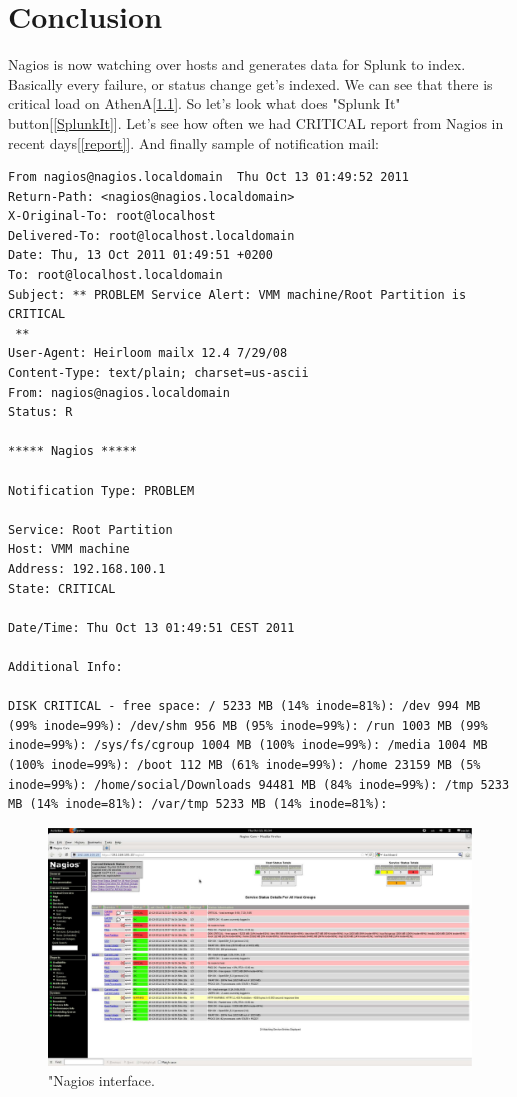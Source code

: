 \documentclass[10pt,a4paper,final]{report}
\begin{document}
\chapter{Conclusion}
Nagios is now watching over hosts and generates data for Splunk to index. Basically every failure, or status change get's indexed. We can see that there is critical load on AthenA[\ref{Nagios}]. So let's look what does "Splunk It" button[\ref{SplunkIt}]. Let's see how often we had CRITICAL report from Nagios in recent days[\ref{report}]. And finally sample of notification mail:
\begin{lstlisting}
From nagios@nagios.localdomain  Thu Oct 13 01:49:52 2011
Return-Path: <nagios@nagios.localdomain>
X-Original-To: root@localhost
Delivered-To: root@localhost.localdomain
Date: Thu, 13 Oct 2011 01:49:51 +0200
To: root@localhost.localdomain
Subject: ** PROBLEM Service Alert: VMM machine/Root Partition is CRITICAL
 **
User-Agent: Heirloom mailx 12.4 7/29/08
Content-Type: text/plain; charset=us-ascii
From: nagios@nagios.localdomain
Status: R

***** Nagios *****

Notification Type: PROBLEM

Service: Root Partition
Host: VMM machine
Address: 192.168.100.1
State: CRITICAL

Date/Time: Thu Oct 13 01:49:51 CEST 2011

Additional Info:

DISK CRITICAL - free space: / 5233 MB (14% inode=81%): /dev 994 MB (99% inode=99%): /dev/shm 956 MB (95% inode=99%): /run 1003 MB (99% inode=99%): /sys/fs/cgroup 1004 MB (100% inode=99%): /media 1004 MB (100% inode=99%): /boot 112 MB (61% inode=99%): /home 23159 MB (5% inode=99%): /home/social/Downloads 94481 MB (84% inode=99%): /tmp 5233 MB (14% inode=81%): /var/tmp 5233 MB (14% inode=81%):
\end{lstlisting}
\begin{figure}[hbpt]
\begin{center}
\includegraphics[width=\linewidth]{Nagios.pdf}
\end{center}
\caption{"Nagios interface.}
\label{Nagios}
\end{figure}
\end{document}
